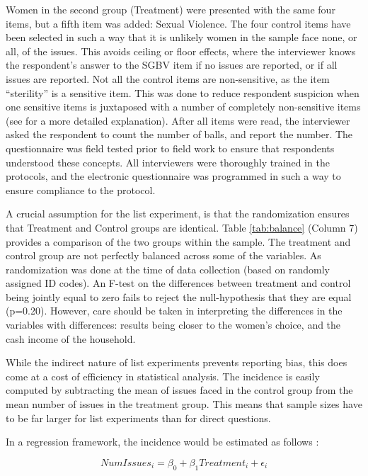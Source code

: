 \documentclass[10pt,a4paper,abstract=on]{scrartcl} %
\begin{document}
Women in the second group (Treatment) were presented with the same four items, but a fifth item was added: Sexual Violence.  The four control items have been selected in such a way that it is unlikely women in the sample face none, or all, of the issues. This avoids ceiling or floor effects, where the interviewer knows the respondent's answer to the SGBV item if no issues are reported, or if all issues are reported. Not all the control items are non-sensitive, as the item ``sterility'' is a sensitive item. This was done to reduce respondent suspicion when one sensitive items is juxtaposed with a number of completely non-sensitive items (see \citet{Chuang2019} for a more detailed explanation). After all items were read, the interviewer asked the respondent to count the number of balls, and report the number. The questionnaire was field tested prior to field work to ensure that respondents understood these concepts. All interviewers were thoroughly trained in the protocols, and the electronic questionnaire was programmed in such a way to ensure compliance to the protocol.

A crucial assumption for the list experiment, is that the randomization ensures that Treatment and Control groups are identical. Table \ref{tab:balance} (Column 7) provides a comparison of the two groups within the sample. The treatment and control group are not perfectly balanced across some of the variables. As randomization was done at the time of data collection (based on randomly assigned ID codes). An F-test on the differences between treatment and control being jointly equal to zero fails to reject the null-hypothesis that they are equal (p=0.20). However, care should be taken in interpreting the differences in the variables with differences: results being closer to the women's choice, and the cash income of the household. 

While the indirect nature of list experiments prevents reporting bias, this does come at a cost of efficiency in statistical analysis. The incidence is easily computed by subtracting the mean of issues faced in the control group from the mean number of issues in the treatment group. This means that sample sizes have to be far larger for list experiments than for direct questions. 

In a regression framework, the incidence would be estimated as follows \cite{Holbrook2010}:

\begin{equation}
\label{eq:basic}
NumIssues_i = \beta_0 + \beta_1 Treatment_i + \epsilon_i
\end{equation}
\end{document}
